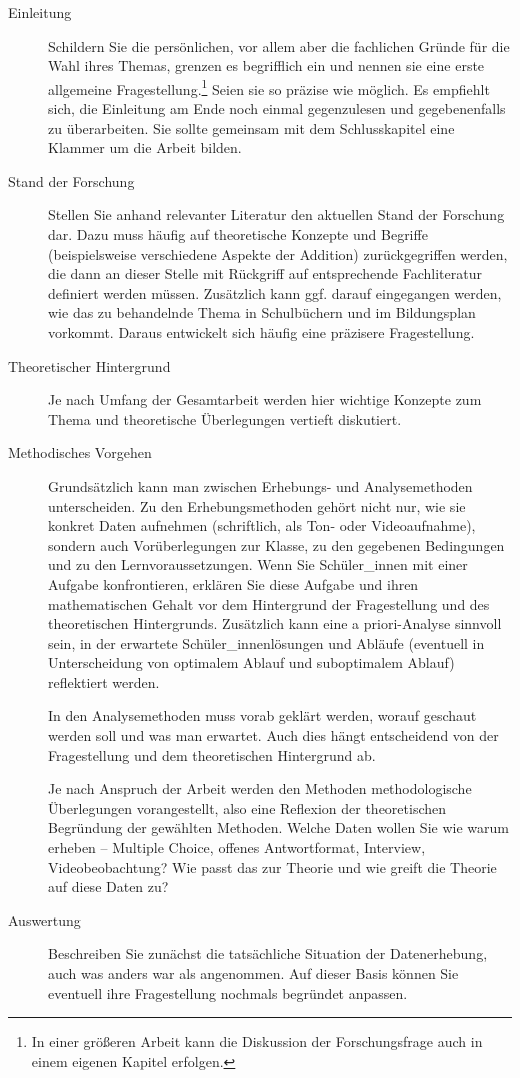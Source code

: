 \documentclass[
  bibliography=totoc,
  oneside,
  12pt,
  a4paper]{scrbook}
\begin{document}
\begin{description}
\item[Einleitung]
Schildern Sie die persönlichen, vor allem aber die fachlichen Gründe
für die Wahl ihres Themas, grenzen es begrifflich ein und nennen sie
eine erste allgemeine Fragestellung.\footnote{In einer größeren Arbeit kann die Diskussion der Forschungsfrage
  auch in einem eigenen Kapitel erfolgen.} Seien sie so präzise
wie möglich. Es empfiehlt sich, die Einleitung am Ende noch einmal
gegenzulesen und gegebenenfalls zu überarbeiten. Sie sollte
gemeinsam mit dem Schlusskapitel eine Klammer um die Arbeit bilden.
\item[Stand der Forschung]
Stellen Sie anhand relevanter Literatur den aktuellen Stand der
Forschung dar. Dazu muss häufig auf theoretische Konzepte und Begriffe (beispielsweise verschiedene Aspekte der Addition) zurückgegriffen werden, die dann an dieser Stelle mit Rückgriff auf entsprechende Fachliteratur definiert werden müssen. Zusätzlich kann ggf. darauf eingegangen werden, wie das zu behandelnde Thema in Schulbüchern und im Bildungsplan vorkommt. Daraus entwickelt sich häufig eine präzisere Fragestellung.
\item[Theoretischer Hintergrund]
Je nach Umfang der Gesamtarbeit werden hier wichtige Konzepte zum Thema und theoretische Überlegungen vertieft diskutiert.
\item[Methodisches Vorgehen]
Grundsätzlich kann man zwischen Erhebungs- und
Analysemethoden unterscheiden. Zu den Erhebungsmethoden gehört nicht
nur, wie sie konkret Daten aufnehmen (schriftlich, als Ton- oder
Videoaufnahme), sondern auch Vorüberlegungen zur Klasse, zu den
gegebenen Bedingungen und zu den Lernvoraussetzungen. Wenn Sie
Schüler\_innen mit einer Aufgabe konfrontieren, erklären Sie diese
Aufgabe und ihren mathematischen Gehalt vor dem Hintergrund der
Fragestellung und des theoretischen Hintergrunds. Zusätzlich kann
eine a priori-Analyse sinnvoll sein, in der erwartete
Schüler\_innenlösungen und Abläufe (eventuell in Unterscheidung von
optimalem Ablauf und suboptimalem Ablauf) reflektiert werden.

In den Analysemethoden muss vorab geklärt werden, worauf geschaut
werden soll und was man erwartet. Auch dies hängt entscheidend von
der Fragestellung und dem theoretischen Hintergrund ab.

Je nach Anspruch der Arbeit werden den Methoden methodologische
Überlegungen vorangestellt, also eine Reflexion der theoretischen
Begründung der gewählten Methoden. Welche Daten wollen Sie wie warum
erheben -- Multiple Choice, offenes Antwortformat, Interview,
Videobeobachtung? Wie passt das zur Theorie und wie greift die
Theorie auf diese Daten zu?
\item[Auswertung]
Beschreiben Sie zunächst die tatsächliche Situation der
Datenerhebung, auch was anders war als angenommen. Auf dieser Basis
können Sie eventuell ihre Fragestellung nochmals begründet anpassen.


\end{description}
\end{document}
